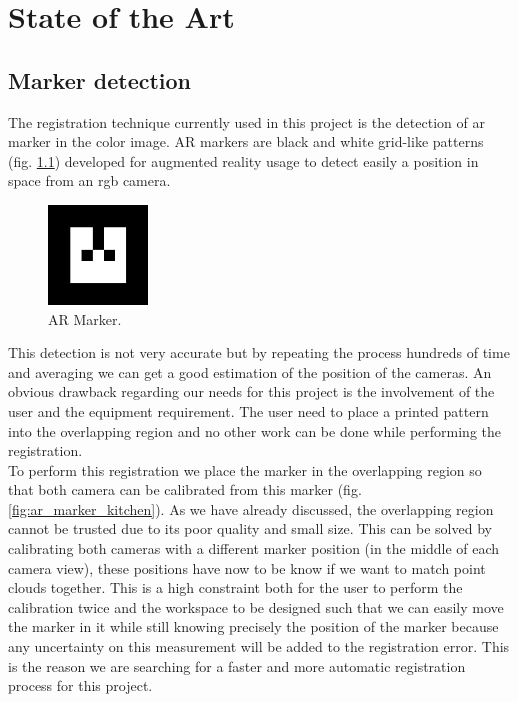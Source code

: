 
\chapter{State of the Art} \label{ch:soa}


\section{Marker detection}

The registration technique currently used in this project is the detection of \acrshort{ar} marker in the color image. AR markers are black and white grid-like patterns (fig. \ref{fig:ar_marker}) developed for augmented reality usage to detect easily a position in space from an \acrshort{rgb} camera. \\

\begin{figure}[h!]
    \centering
    \includegraphics[width=100px]{images/armarker.png}
    \caption{AR Marker.}
    \label{fig:ar_marker}
\end{figure}

This detection is not very accurate but by repeating the process hundreds of time and averaging we can get a good estimation of the position of the cameras. An obvious drawback regarding our needs for this project is the involvement of the user and the equipment requirement. The user need to place a printed pattern into the overlapping region and no other work can be done while performing the registration. \\
To perform this registration we place the marker in the overlapping region so that both camera can be calibrated from this marker (fig. \ref{fig:ar_marker_kitchen}). As we have already discussed, the overlapping region cannot be trusted due to its poor quality and small size. This can be solved by calibrating both cameras with a different marker position (in the middle of each camera view), these positions have now to be know if we want to match point clouds together. This is a high constraint both for the user to perform the calibration twice and the workspace to be designed such that we can easily move the marker in it while still knowing precisely the position of the marker because any uncertainty on this measurement will be added to the registration error. This is the reason we are searching for a faster and more automatic registration process for this project. \\

